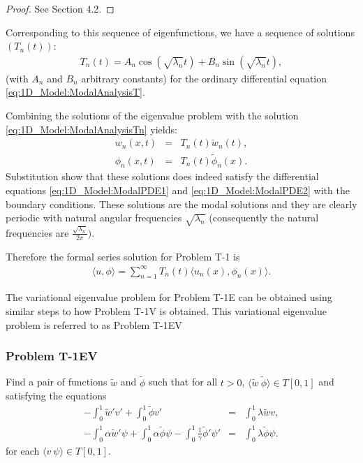 \documentclass[../../main.tex]{subfiles}
\begin{document}
\begin{proof}
	See Section 4.2.
\end{proof}

Corresponding to this sequence of eigenfunctions, we have a sequence of solutions $(T_n(t))$:
\begin{eqnarray}
	T_n(t)=A_n\cos(\sqrt{\lambda_n}t)+B_n\sin(\sqrt{\lambda_n}t), \label{eq:1D_Model:ModalAnalysisTn}
\end{eqnarray}
(with $A_n$ and $B_n$ arbitrary constants) for the ordinary differential equation \eqref{eq:1D_Model:ModalAnalysisT}.

Combining the solutions of the eigenvalue problem with the solution \eqref{eq:1D_Model:ModalAnalysisTn} yields:
\begin{eqnarray*}
	w_n(x,t) & = & T_n(t)\tilde{w}_n(t), \\
	\phi_n(x,t) & = & T_n(t)\tilde{\phi}_n(x).
\end{eqnarray*} 
Substitution show that these solutions does indeed satisfy the differential equations \eqref{eq:1D_Model:ModalPDE1} and \eqref{eq:1D_Model:ModalPDE2} with the boundary conditions. These solutions are the modal solutions and they are clearly periodic with natural angular frequencies $\sqrt{\lambda_n}$ (consequently the natural frequencies are $\frac{\sqrt{\lambda_n}}{2 \pi})$.

Therefore the formal series solution for Problem T-1 is
\begin{eqnarray*}
	\langle u, \phi \rangle = \sum_{n=1}^{\infty} T_n(t)\langle u_n(x), \phi_n(x)\rangle.
\end{eqnarray*}

The variational eigenvalue problem for Problem T-1E can be obtained using similar steps to how Problem T-1V is obtained. This variational eigenvalue problem is referred to as Problem T-1EV

\subsubsection*{Problem T-1EV}\label{sssec:1D_Model:ProblemT1EV}
Find a pair of functions $\tilde{w}$ and $\tilde{\phi}$ such that for all $t >0$, $\langle \tilde{w}\ \tilde{\phi}\rangle \in  T[0,1]$ and satisfying the equations
\begin{eqnarray*}
	 -\int_0^1 \tilde{w}'v'  + \int_0^1 \tilde{\phi} v' &=& \int_0^1 \lambda \tilde{w} v ,\\
	 -\int_0^1\alpha \tilde{w}' \psi + \int_0^1\alpha \tilde{\phi} \psi - \int_0^1\frac{1}{\gamma}\tilde{\phi}' \psi' &=& \int_0^1 \lambda \tilde{\phi} \psi .
\end{eqnarray*} for each $\langle v \ \psi\rangle \in T[0,1]$.
\end{document}

